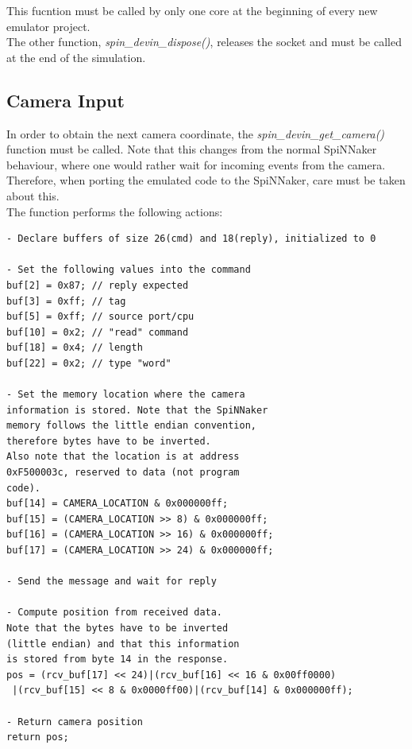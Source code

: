 \documentclass{article}
\begin{document}
This fucntion must be called by only one core at the beginning of every new emulator project.\\
The other function, \textit{spin\_devin\_dispose()}, releases the socket and must be called at the end of the simulation.

\subsection{Camera Input}
In order to obtain the next camera coordinate, the \textit{spin\_devin\_get\_camera()} function must be called. Note that this changes from the normal SpiNNaker behaviour, where one would rather wait for incoming events from the camera. Therefore, when porting the emulated code to the SpiNNaker, care must be taken about this.\\
The function performs the following actions:
\begin{verbatim}
- Declare buffers of size 26(cmd) and 18(reply), initialized to 0

- Set the following values into the command
buf[2] = 0x87; // reply expected
buf[3] = 0xff; // tag
buf[5] = 0xff; // source port/cpu
buf[10] = 0x2; // "read" command
buf[18] = 0x4; // length
buf[22] = 0x2; // type "word"

- Set the memory location where the camera
information is stored. Note that the SpiNNaker
memory follows the little endian convention,
therefore bytes have to be inverted.
Also note that the location is at address
0xF500003c, reserved to data (not program
code).
buf[14] = CAMERA_LOCATION & 0x000000ff;
buf[15] = (CAMERA_LOCATION >> 8) & 0x000000ff;
buf[16] = (CAMERA_LOCATION >> 16) & 0x000000ff;
buf[17] = (CAMERA_LOCATION >> 24) & 0x000000ff;

- Send the message and wait for reply

- Compute position from received data.
Note that the bytes have to be inverted
(little endian) and that this information
is stored from byte 14 in the response.
pos = (rcv_buf[17] << 24)|(rcv_buf[16] << 16 & 0x00ff0000)
 |(rcv_buf[15] << 8 & 0x0000ff00)|(rcv_buf[14] & 0x000000ff);

- Return camera position
return pos;
\end{verbatim}
\end{document}
